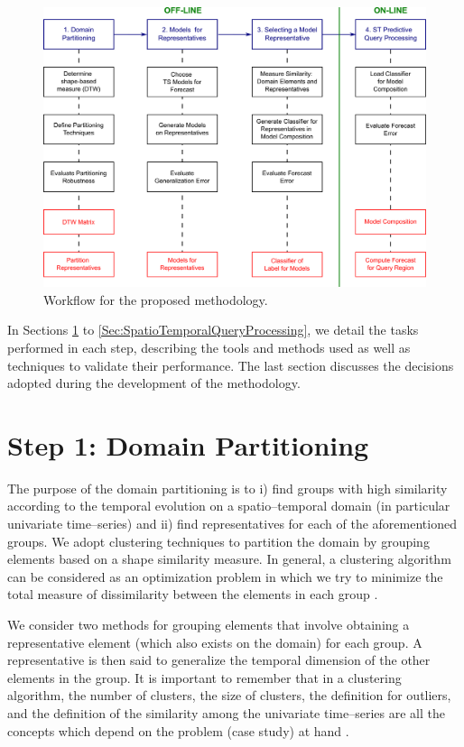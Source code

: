 \begin{figure}[h]
	\centering
	\includegraphics[scale=0.14]{../Figures/Methodology_Complete}
	\caption{Workflow for the proposed methodology.}
	\label{Fig:OverviewMethodology}
\end{figure}

In Sections \ref{Sec:DomainPartitioning} to \ref{Sec:SpatioTemporalQueryProcessing}, we detail the tasks performed in each step, describing the tools and methods used as well as techniques to validate their performance. The last section discusses the decisions adopted during the development of the methodology.

\section{Step 1: Domain Partitioning}
\label{Sec:DomainPartitioning}

The purpose of the domain partitioning is to i) find groups with high similarity according to the temporal evolution on a spatio--temporal domain (in particular univariate time--series) and ii) find representatives for each of the aforementioned groups. We adopt clustering techniques to partition the domain by grouping elements based on a shape similarity measure. In general, a clustering algorithm can be considered as an optimization problem in which we try to minimize the total measure of dissimilarity between the elements in each group \cite{Liao2005}.

We consider two methods for grouping elements that involve obtaining a representative element (which also exists on the domain) for each group. A representative is then said to generalize the temporal dimension of the other elements in the group. It is important to remember that in a clustering algorithm, the number of clusters, the size of clusters, the definition for outliers, and the definition of the similarity among the univariate time--series are all the concepts which depend on the problem (case study) at hand \cite{Aghabozorgi2015}.


